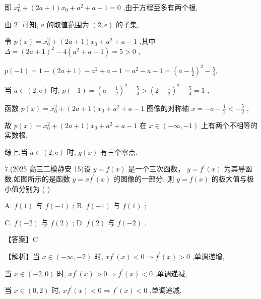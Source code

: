 \documentclass[10pt]{article}
\begin{document}
即 \({x}_{0}^{2} + \left( {{2a} + 1}\right) {x}_{0} + {a}^{2} + a - 1 = 0\) ,由于方程至多有两个根,

由 \({2}^{ \circ  }\) 可知, \(a\) 的取值范围为 \(\left( {2,\mathrm{e}}\right)\) 的子集,

令 \(p\left( x\right)  = {x}_{0}^{2} + \left( {{2a} + 1}\right) {x}_{0} + {a}^{2} + a - 1\) ,其中 \(\Delta  = {\left( 2a + 1\right) }^{2} - 4\left( {{a}^{2} + a - 1}\right)  = 5 > 0\) ,

\(p\left( {-1}\right)  = 1 - \left( {{2a} + 1}\right)  + {a}^{2} + a - 1 = {a}^{2} - a - 1 = {\left( a - \frac{1}{2}\right) }^{2} - \frac{5}{4},\)

当 \(a \in  \left( {2,\mathrm{e}}\right)\) 时, \(p\left( {-1}\right)  = {\left( a - \frac{1}{2}\right) }^{2} - \frac{5}{4} > {\left( 2 - \frac{1}{2}\right) }^{2} - \frac{5}{4} = 1\) ,

函数 \(p\left( x\right)  = {x}_{0}^{2} + \left( {{2a} + 1}\right) {x}_{0} + {a}^{2} + a - 1\) 图像的对称轴 \(x =  - a - \frac{1}{2} <  - \frac{5}{2}\) ,

故 \(p\left( x\right)  = {x}_{0}^{2} + \left( {{2a} + 1}\right) {x}_{0} + {a}^{2} + a - 1\) 在 \(x \in  \left( {-\infty , - 1}\right)\) 上有两个不相等的实数根,

综上,当 \(a \in  \left( {2,\mathrm{e}}\right)\) 时, \(g\left( x\right)\) 有三个零点.

7.(2025 高三二模静安 15)设 \(y = f\left( x\right)\) 是一个三次函数， \(y = {f}^{\prime }\left( x\right)\) 为其导函数.如图所示的是函数 \(y = x{f}^{\prime }\left( x\right)\) 的图像的一部分. 则 \(y = f\left( x\right)\) 的极大值与极小值分别为 ( )

A. \(f\left( 1\right)\) 与 \(f\left( {-1}\right)\) ; B. \(f\left( {-1}\right)\) 与 \(f\left( 1\right)\) ;

C. \(f\left( {-2}\right)\) 与 \(f\left( 2\right)\) ; D. \(f\left( 2\right)\) 与 \(f\left( {-2}\right)\) .

【答案】C

【解析】当 \(x \in  \left( {-\infty , - 2}\right)\) 时, \(x{f}^{\prime }\left( x\right)  < 0 \Rightarrow  {f}^{\prime }\left( x\right)  > 0\) ,单调递增,

当 \(x \in  \left( {-2,0}\right)\) 时, \(x{f}^{\prime }\left( x\right)  > 0 \Rightarrow  {f}^{\prime }\left( x\right)  < 0\) ,单调递减,

当 \(x \in  \left( {0,2}\right)\) 时, \(x{f}^{\prime }\left( x\right)  < 0 \Rightarrow  {f}^{\prime }\left( x\right)  < 0\) ,单调递减,
\end{document}

